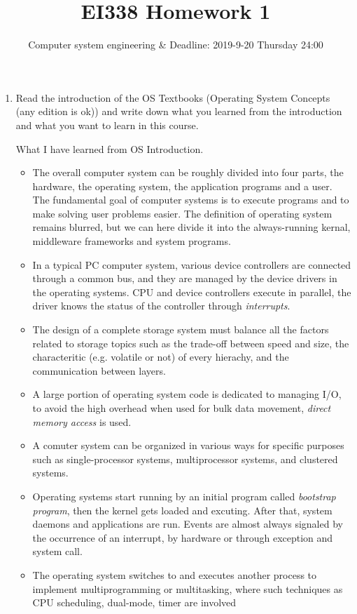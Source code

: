 \documentclass{article}
\title{EI338 Homework 1}
\author{Computer system engineering \& Deadline: 2019-9-20 Thursday 24:00}
\begin{document}
\maketitle

\begin{enumerate}

\item Read the introduction of the OS Textbooks (Operating System Concepts (any edition is ok)) and write down what you learned from the introduction and what you want to learn in this course.

What I have learned from OS Introduction.

\begin{itemize}
    \item The overall computer system can be roughly divided into four parts, the hardware, the operating system, the application programs and a user. The fundamental goal of computer systems is to execute programs and to make solving user problems easier. The definition of operating system remains blurred, but we can here divide it into the always-running kernal, middleware frameworks and system programs.
    \item In a typical PC computer system, various device controllers are connected through a common bus, and they are managed by the device drivers in the operating systems. CPU and device controllers execute in parallel, the driver knows the status of the controller through \textit{interrupts}. 
    \item The design of a complete storage system must balance all the factors related to storage topics such as the trade-off between speed and size, the characteritic (e.g. volatile or not) of every hierachy, and the communication between layers.
    \item A large portion of operating system code is dedicated to managing I/O, to avoid the high overhead when used for bulk data movement, \textit{direct memory access} is used.
    \item A comuter system can be organized in various ways for specific purposes such as single-processor systems, multiprocessor systems, and clustered systems.
    \item Operating systems start running by an initial program called \textit{bootstrap program}, then the kernel gets loaded and excuting. After that, system daemons and applications are run. Events are almost always signaled by the occurrence of an interrupt, by hardware or through exception and system call.
    \item The operating system switches to and executes another process to implement multiprogramming or multitasking, where such techniques as CPU scheduling, dual-mode, timer are involved

\end{itemize}
\end{enumerate}
\end{document}
